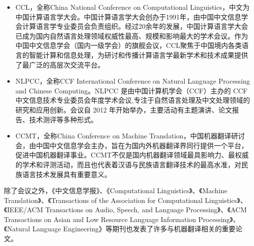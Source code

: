 \begin{itemize}
\vspace{0.5em}
\item CCL，全称China National Conference on Computational Linguistics，中文为中国计算语言学大会。中国计算语言学大会创办于1991年，由中国中文信息学会计算语言学专业委员会负责组织。经过20余年的发展，中国计算语言学大会已成为国内自然语言处理领域权威性最高、规模和影响最大的学术会议。作为中国中文信息学会（国内一级学会）的旗舰会议，CCL聚焦于中国境内各类语言的智能计算和信息处理，为研讨和传播计算语言学最新学术和技术成果提供了最广泛的高层次交流平台。
\vspace{0.5em}
\item NLPCC，全称CCF International Conference on Natural Language Processing and Chinese Computing。NLPCC 是由中国计算机学会（CCF）主办的 CCF 中文信息技术专业委员会年度学术会议,专注于自然语言处理及中文处理领域的研究和应用创新。会议自 2012 年开始举办，主要活动有主题演讲、论文报告、技术测评等多种形式。
\vspace{0.5em}
\item CCMT，全称China Conference on Machine Translation，中国机器翻译研讨会，由中国中文信息学会主办，旨在为国内外机器翻译界同行提供一个平台，促进中国机器翻译事业。CCMT不仅是国内机器翻译领域最具影响力、最权威的学术和评测活动，而且也代表着汉语与民族语言翻译技术的最高水准，对民族语言技术发展具有重要意义。
\vspace{0.5em}
\end{itemize}

除了会议之外，《中文信息学报》、《Computational Linguistics》、《Machine Translation》、《Transactions of the Association for Computational Linguistics》、《IEEE/ACM Transactions on Audio, Speech, and Language Processing》、《ACM Transactions on Asian and Low Resource Language Information Processing》、《Natural Language Engineering》等期刊也发表了许多与机器翻译相关的重要论文。










